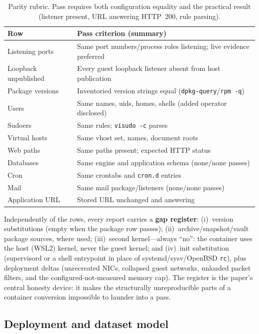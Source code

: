 \documentclass[3p,twocolumn,authoryear]{elsarticle}
\begin{document}
\begin{table}[tbp]
\caption{Parity rubric. Pass requires both configuration equality and
the practical result (listener present, URL answering HTTP~200, rule
parsing).}
\label{tab:rubric}
\centering\footnotesize
\begin{tabularx}{\columnwidth}{lX}
\toprule
Row & Pass criterion (summary)\\
\midrule
Listening ports & Same port numbers/process roles listening; live evidence preferred\\
Loopback unpublished & Every guest loopback listener absent from host publication\\
Package versions & Inventoried version strings equal (\texttt{dpkg-query}/\texttt{rpm -q})\\
Users & Same names, uids, homes, shells (added operator disclosed)\\
Sudoers & Same rules; \texttt{visudo -c} parses\\
Virtual hosts & Same vhost set, names, document roots\\
Web paths & Same paths present; expected HTTP status\\
Databases & Same engine and application schema (none/none passes)\\
Cron & Same crontabs and \texttt{cron.d} entries\\
Mail & Same mail package/listeners (none/none passes)\\
Application URL & Stored URL unchanged and answering\\
\bottomrule
\end{tabularx}
\end{table}

Independently of the rows, every report carries a \textbf{gap
register}: (i)~version substitutions (empty when the package row
passes); (ii)~archive/snapshot/vault package sources, where used;
(iii)~second kernel---always ``no'': the container uses the host (WSL2)
kernel, never the guest kernel; and (iv)~init substitution
(supervisord or a shell entrypoint in place of systemd/sysv/OpenBSD
\texttt{rc}), plus deployment deltas (unrecreated NICs, collapsed guest
networks, unloaded packet filters, and the configured-not-measured
memory cap). The register is the paper's central honesty device: it
makes the structurally unreproducible parts of a container conversion
impossible to launder into a pass.

\subsection{Deployment and dataset model}
\end{document}
